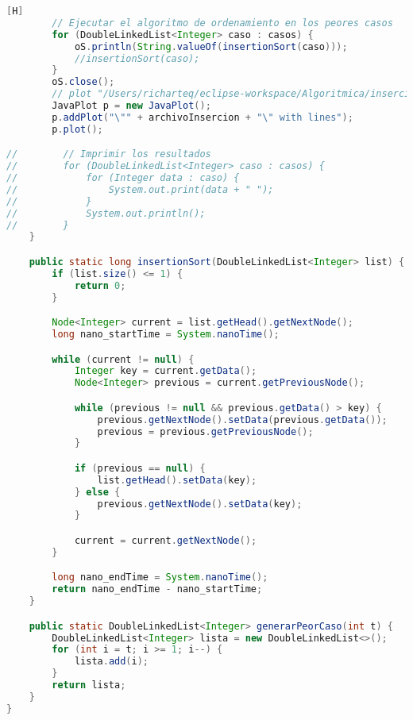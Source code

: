 \begin{enumerate}[{Ejercicio} 1.]
\begin{lstlisting}[language=java, caption={Test}][H]
        // Ejecutar el algoritmo de ordenamiento en los peores casos
        for (DoubleLinkedList<Integer> caso : casos) {
            oS.println(String.valueOf(insertionSort(caso)));
            //insertionSort(caso);
        }
        oS.close();
        // plot "/Users/richarteq/eclipse-workspace/Algoritmica/insercion.txt" with lines
        JavaPlot p = new JavaPlot();
        p.addPlot("\"" + archivoInsercion + "\" with lines");
        p.plot();

//        // Imprimir los resultados
//        for (DoubleLinkedList<Integer> caso : casos) {
//            for (Integer data : caso) {
//                System.out.print(data + " ");
//            }
//            System.out.println();
//        }
    }

    public static long insertionSort(DoubleLinkedList<Integer> list) {
        if (list.size() <= 1) {
            return 0;
        }

        Node<Integer> current = list.getHead().getNextNode();
        long nano_startTime = System.nanoTime();

        while (current != null) {
            Integer key = current.getData();
            Node<Integer> previous = current.getPreviousNode();

            while (previous != null && previous.getData() > key) {
                previous.getNextNode().setData(previous.getData());
                previous = previous.getPreviousNode();
            }

            if (previous == null) {
                list.getHead().setData(key);
            } else {
                previous.getNextNode().setData(key);
            }

            current = current.getNextNode();
        }

        long nano_endTime = System.nanoTime();
        return nano_endTime - nano_startTime;
    }

    public static DoubleLinkedList<Integer> generarPeorCaso(int t) {
        DoubleLinkedList<Integer> lista = new DoubleLinkedList<>();
        for (int i = t; i >= 1; i--) {
            lista.add(i);
        }
        return lista;
    }
}

	\end{lstlisting}
	
\end{enumerate}